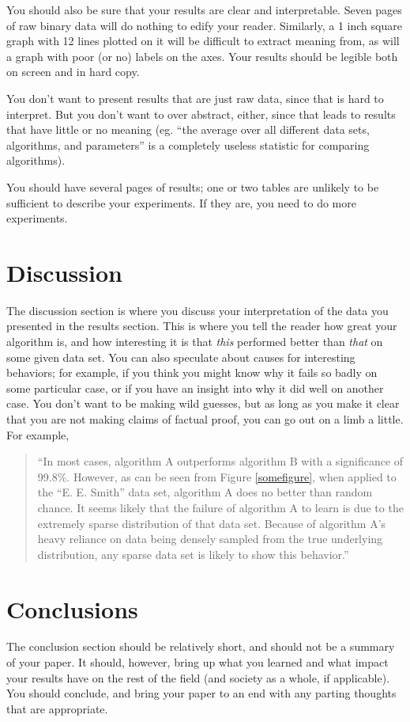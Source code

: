 \documentclass[12pt, letterpaper]{article}
\begin{document}
You should also be sure that your results are clear and interpretable.  Seven
pages of raw binary data will do nothing to edify your reader.  Similarly, a
1 inch square graph with 12 lines plotted on it will be difficult to extract
meaning from, as will a graph with poor (or no) labels on the axes.  Your
results should be legible both on screen and in hard copy.

You don't want to present results that are just raw data, since that is hard to
interpret.  But you don't want to over abstract, either, since that leads to
results that have little or no meaning (eg. ``the average over all different
data sets, algorithms, and parameters'' is a completely useless statistic for
comparing algorithms).

You should have several pages of results; one or two tables are unlikely to be
sufficient to describe your experiments.  If they are, you need to do more
experiments.

\section{Discussion}
The discussion section is where you discuss your interpretation of the data you
presented in the results section.  This is where you tell the reader how great
your algorithm is, and how interesting it is that \emph{this} performed better
than \emph{that} on some given data set.  You can also speculate about causes
for interesting behaviors; for example, if you think you might know why it fails
so badly on some particular case, or if you have an insight into why it did well
on another case.  You don't want to be making wild guesses, but as long as you
make it clear that you are not making claims of factual proof, you can go out on
a limb a little.  For example,

\begin{quote}
``In most cases, algorithm A outperforms algorithm B with a significance of
99.8\%.  However, as can be seen from Figure \ref{somefigure}, when applied to
the ``E. E. Smith'' data set, algorithm A does no better than random chance.  It
seems likely that the failure of algorithm A to learn is due to the extremely
sparse distribution of that data set.  Because of algorithm A's heavy reliance
on data being densely sampled from the true underlying distribution, any sparse
data set is likely to show this behavior.''
\end{quote}

\section{Conclusions}
The conclusion section should be relatively short, and should not be a summary
of your paper.  It should, however, bring up what you learned and what impact
your results have on the rest of the field (and society as a
whole, if applicable).  You should conclude, and bring your paper to an  end
with any parting thoughts that are appropriate.
\end{document}
